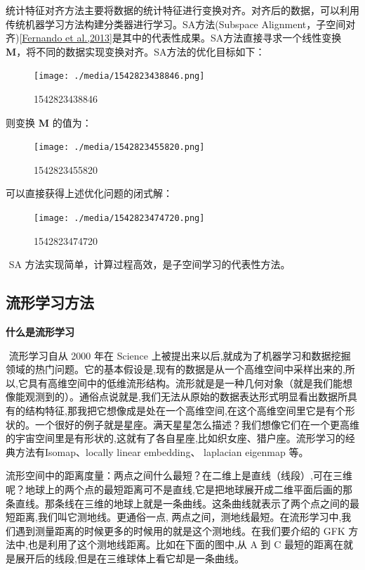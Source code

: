 ​
统计特征对齐方法主要将数据的统计特征进行变换对齐。对齐后的数据，可以利用传统机器学习方法构建分类器进行学习。SA方法(Subspace
Alignment，子空间对齐){[}\protect\hyperlink{bookmark249}{Fernando et
al.,2013}{]}是其中的代表性成果。SA方法直接寻求一个线性变换\textbf{M}，将不同的数据实现变换对齐。SA方法的优化目标如下：

\begin{figure}
\centering
\texttt{[image: ./media/1542823438846.png]}
\caption{1542823438846}
\end{figure}

则变换 \textbf{M} 的值为：

\begin{figure}
\centering
\texttt{[image: ./media/1542823455820.png]}
\caption{1542823455820}
\end{figure}

可以直接获得上述优化问题的闭式解：

\begin{figure}
\centering
\texttt{[image: ./media/1542823474720.png]}
\caption{1542823474720}
\end{figure}

​ SA 方法实现简单，计算过程高效，是子空间学习的代表性方法。

\subsection{流形学习方法}\label{ux6d41ux5f62ux5b66ux4e60ux65b9ux6cd5}

\textbf{什么是流形学习}

​ 流形学习自从 2000 年在 Science
上被提出来以后,就成为了机器学习和数据挖掘领域的热门问题。它的基本假设是,现有的数据是从一个高维空间中采样出来的,所以,它具有高维空间中的低维流形结构。流形就是是一种几何对象（就是我们能想像能观测到的）。通俗点说就是,我们无法从原始的数据表达形式明显看出数据所具有的结构特征,那我把它想像成是处在一个高维空间,在这个高维空间里它是有个形状的。一个很好的例子就是星座。满天星星怎么描述？我们想像它们在一个更高维的宇宙空间里是有形状的,这就有了各自星座,比如织女座、猎户座。流形学习的经典方法有Isomap、locally
linear embedding、 laplacian eigenmap 等。

​
流形空间中的距离度量：两点之间什么最短？在二维上是直线（线段）,可在三维呢？地球上的两个点的最短距离可不是直线,它是把地球展开成二维平面后画的那条直线。那条线在三维的地球上就是一条曲线。这条曲线就表示了两个点之间的最短距离,我们叫它测地线。更通俗一点,
两点之间，测地线最短。在流形学习中,我们遇到测量距离的时候更多的时候用的就是这个测地线。在我们要介绍的
GFK 方法中,也是利用了这个测地线距离。比如在下面的图中,从 A 到 C
最短的距离在就是展开后的线段,但是在三维球体上看它却是一条曲线。

